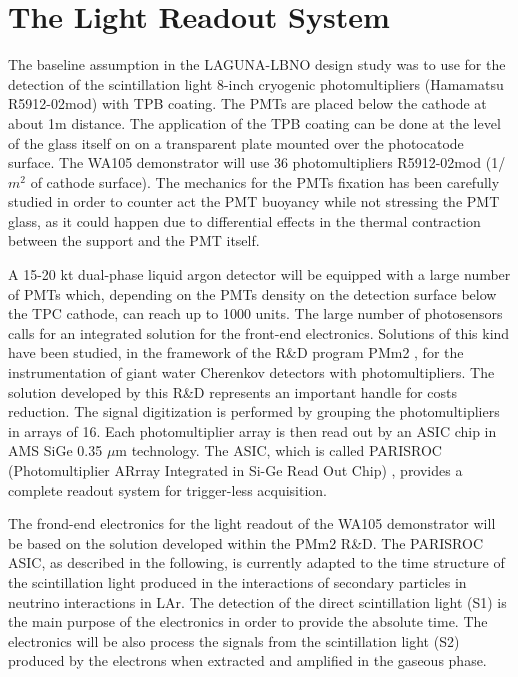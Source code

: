 \section{The Light Readout System} 
\label{sec:detectors-fd-alt-light}

The baseline assumption in the LAGUNA-LBNO design study was to use for the detection of the scintillation light 8-inch cryogenic photomultipliers (Hamamatsu R5912-02mod) with TPB coating. The PMTs are placed below the cathode at about 1m distance.  The application of the TPB coating can be done at the level of the glass itself on on a transparent plate mounted over the photocatode surface. The WA105 demonstrator will use 36  photomultipliers R5912-02mod (1/$m^2$ of cathode surface). The mechanics for the PMTs fixation has been carefully studied in order to counter act the PMT buoyancy while not stressing the PMT glass, as it could happen due to  differential effects  in the thermal contraction between the support and the PMT itself.

A 15-20 kt dual-phase liquid argon detector will be equipped with a large number of PMTs which, depending on the PMTs density on the detection surface below the TPC cathode, can reach up to 1000 units. The large number of photosensors calls for an integrated solution for the front-end electronics. Solutions of this kind have been studied, in the framework of the R\&D program PMm2 \cite{PMM2-1, PMM2-2}, for the instrumentation of giant water Cherenkov detectors with photomultipliers. The solution developed by this R\&D represents an important handle for costs reduction. The signal digitization is performed by grouping the photomultipliers in arrays of 16. Each photomultiplier array is then read out by an ASIC chip in AMS SiGe 0.35 $\mu$m technology. The ASIC,
which is called PARISROC (Photomultiplier ARrray Integrated in Si-Ge Read Out Chip)  \cite{Parisroc}, provides a complete readout system for trigger-less acquisition.


The frond-end electronics for the light readout of the WA105 demonstrator will be based on the solution developed within the PMm2 R\&D. The PARISROC ASIC, as described in the following, is currently adapted to the  time structure of the scintillation light produced in the interactions of secondary particles in neutrino interactions in LAr. The detection of the direct scintillation light (S1) is the main purpose of the electronics in order to provide the absolute time.
The electronics will be also process the signals from the scintillation light (S2) produced by the electrons when extracted and amplified in the gaseous phase.

